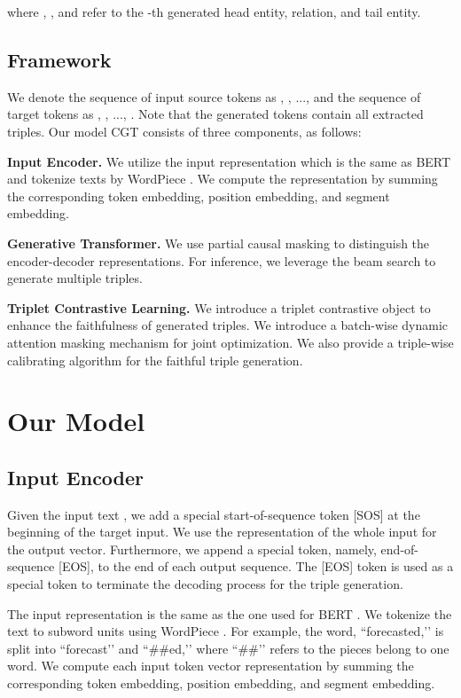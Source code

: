 \documentclass[letterpaper]{article} \usepackage{aaai21}  \usepackage{times}  \usepackage{helvet} \usepackage{courier}  \usepackage[hyphens]{url}  \usepackage{graphicx} \urlstyle{rm} \def\UrlFont{\rm}  \usepackage{natbib}  \usepackage[noend]{algpseudocode}
\begin{document}
where , , and  refer to the -th generated head entity, relation, and tail entity. 
\subsection{Framework}

We denote the sequence of input source tokens as , , ...,  and the sequence of target tokens as , , ..., . Note that the generated tokens contain all extracted triples. Our model CGT consists of three components, as follows:

\textbf{Input Encoder.} We utilize the input representation which  is the same as BERT \cite{devlin2018bert} and tokenize texts by WordPiece \cite{yonghui2016bridging}. We compute the representation by summing the corresponding token embedding, position embedding, and segment embedding. 

\textbf{Generative Transformer.} We use partial causal masking to distinguish the encoder-decoder representations. For inference, we leverage the beam search \cite{wiseman2016sequence} to generate multiple triples.  

\textbf{Triplet Contrastive Learning.} We introduce a triplet contrastive object to enhance the faithfulness of generated triples. We introduce a batch-wise dynamic attention masking mechanism for joint optimization. We also provide a triple-wise calibrating algorithm for the faithful triple generation. 

\section{Our Model}
\subsection{Input Encoder}
Given the input text , we add a special start-of-sequence token [SOS] at the beginning of the target input. We use the representation of the whole input for the output vector.  Furthermore, we append a special token, namely, end-of-sequence [EOS], to the end of each output sequence. The [EOS] token is used as a special token to terminate the decoding process for the triple generation.  

The input representation is the same as the one used for BERT \cite{devlin2018bert}. We tokenize the text to subword units using WordPiece \cite{yonghui2016bridging}. For example, the word, ``forecasted,’’ is split into ``forecast’’ and ``\#\#ed,’’ where ``\#\#’’ refers to the pieces belong to one word. We compute each input token vector representation by summing the corresponding token embedding, position embedding, and segment embedding.  
\end{document}
